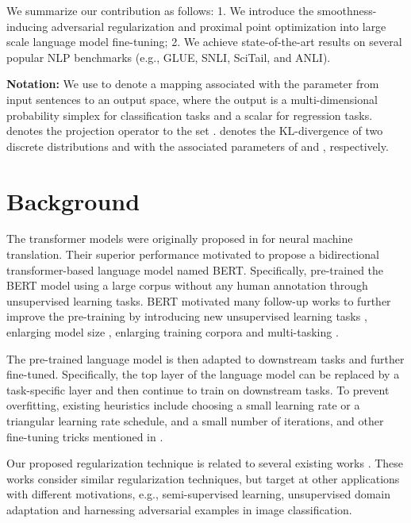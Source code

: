 \documentclass[11pt]{article} \usepackage{url}
\begin{document}
We summarize our contribution as follows:
1. We introduce the smoothness-inducing adversarial regularization and proximal point optimization into large scale language model fine-tuning;
2. We achieve state-of-the-art results on several popular NLP benchmarks (e.g., GLUE, SNLI, SciTail, and ANLI).


\noindent \textbf{Notation:} We use  to denote a mapping  associated with the parameter  from input sentences  to an output space, where the output is a multi-dimensional probability simplex for classification tasks and a scalar for regression tasks.  denotes the projection operator to the set .  denotes the KL-divergence of two discrete distributions  and  with the associated parameters of  and , respectively.

\vspace{-0.05in}
\section{Background} \label{sec:background}
\vspace{-0.05in}



The transformer models were originally proposed in \citet{vaswani2017attention} for neural machine translation. Their superior performance motivated \citet{devlin2018bert} to propose a bidirectional transformer-based language model named BERT. Specifically, \citet{devlin2018bert} pre-trained the BERT model using a large corpus without any human annotation through unsupervised learning tasks. BERT motivated many follow-up works to further improve the pre-training by introducing new unsupervised learning tasks \citep{yang2019xlnet,dong2019unified,joshi2019spanbert}, enlarging model size \citep{lan2019albert,raffel2019t5}, enlarging training corpora \citep{liu2019roberta,yang2019xlnet,raffel2019t5} and  multi-tasking \citep{liu2019mt-dnn-kd,liu2019mt-dnn}.

The pre-trained language model is then adapted to downstream tasks and further fine-tuned. Specifically, the top layer of the language model can be replaced by a task-specific layer and then continue to train on downstream tasks.
To prevent overfitting, existing heuristics include choosing a small learning rate or a triangular learning rate schedule, and a small number of iterations, and other fine-tuning tricks mentioned in \cite{howard2018universal,peters2019tune,houlsby2019parameter,stickland2019bert}.

Our proposed regularization technique is related to several existing works \cite{miyato2018virtual,zhang2019theoretically,shu2018dirt}. These works consider similar regularization techniques, but target at other applications with different motivations, e.g., semi-supervised learning, unsupervised domain adaptation and harnessing adversarial examples in image classification.
\end{document}

